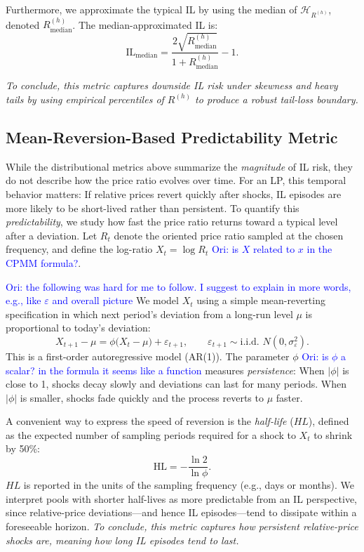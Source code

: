 \documentclass[journal]{IEEEtran}
\newcommand{\ori}[1]{\textcolor{blue}{Ori: #1}}
\begin{document}
Furthermore, we approximate the typical IL by using the median of \(\mathcal{H}_{R^{(h)}}\), denoted \(R^{(h)}_{\text{median}}\). The median-approximated IL is:
\begin{equation}
\label{eq:il_median}
\mathrm{IL}_{\text{median}} = \frac{2\sqrt{R^{(h)}_{\text{median}}}}{1+R^{(h)}_{\text{median}}} - 1.
\end{equation}

\textit{To conclude, this metric captures downside IL risk under skewness and heavy tails by using empirical percentiles of \(R^{(h)}\) to produce a robust tail-loss boundary.}

\subsection{Mean-Reversion-Based Predictability Metric}
\label{subsubsec:mean_reversion_metric}

While the distributional metrics above summarize the \emph{magnitude} of IL risk, they do not describe how the price ratio evolves over time. 
For an LP, this temporal behavior matters: If relative prices revert quickly after shocks, IL episodes are more likely to be short-lived rather than persistent.
To quantify this \emph{predictability}, we study how fast the price ratio returns toward a typical level after a deviation. 
Let \(R_t\) denote the oriented price ratio sampled at the chosen frequency, and define the log-ratio \(    X_t = \log R_t \) \ori{is $X$ related to $x$ in the CPMM formula?}. 

\ori{the following was hard for me to follow. I suggest to explain in more words, e.g., like $\varepsilon$ and overall picture} We model \(X_t\) using a simple mean-reverting specification in which next period’s deviation from a long-run level \(\mu\) is proportional to today’s deviation:
$$
\label{eq:ar1_ratio}
X_{t+1} - \mu = \phi \bigl(X_t - \mu\bigr) + \varepsilon_{t+1}, 
\qquad \varepsilon_{t+1} \sim \text{i.i.d. } N(0, \sigma^2_\varepsilon).
$$
This is a first-order autoregressive model (AR(1)). The parameter \(\phi\) \ori{is $\phi$ a scalar? in the formula it seems like a function} measures \emph{persistence}: When \(|\phi|\) is close to 1, shocks decay slowly and deviations can last for many periods. When \(|\phi|\) is smaller, shocks fade quickly and the process reverts to \(\mu\) faster.

A convenient way to express the speed of reversion is the \emph{half-life} ($HL$), defined as the expected number of sampling periods required for a shock to \(X_t\) to shrink by 50\%:
\begin{equation}
\label{eq:half_life}
\text{HL} = -\frac{\ln 2}{\ln \phi}.
\end{equation}
$HL$ is reported in the units of the sampling frequency (e.g., days or months). 
We interpret pools with shorter half-lives as more predictable from an IL perspective, since relative-price deviations—and hence IL episodes—tend to dissipate within a foreseeable horizon.
\textit{To conclude, this metric captures how persistent relative-price shocks are, meaning how long IL episodes tend to last.}
\end{document}
